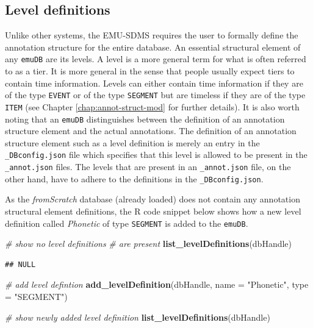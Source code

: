 \documentclass[]{book}
\newenvironment{Shaded}{\begin{snugshade}}{\end{snugshade}}
\newcommand{\CommentTok}[1]{\textcolor[rgb]{0.56,0.35,0.01}{\textit{#1}}}
\newcommand{\DataTypeTok}[1]{\textcolor[rgb]{0.13,0.29,0.53}{#1}}
\newcommand{\KeywordTok}[1]{\textcolor[rgb]{0.13,0.29,0.53}{\textbf{#1}}}
\newcommand{\NormalTok}[1]{#1}
\newcommand{\StringTok}[1]{\textcolor[rgb]{0.31,0.60,0.02}{#1}}
\theoremstyle{definition}
\theoremstyle{definition}
\theoremstyle{definition}
\theoremstyle{remark}
\begin{document}
\hypertarget{level-definitions}{%
\subsection{Level definitions}\label{level-definitions}}

Unlike other systems, the EMU-SDMS requires the user to formally define
the annotation structure for the entire database. An essential
structural element of any \texttt{emuDB} are its levels. A level is a
more general term for what is often referred to as a tier. It is more
general in the sense that people usually expect tiers to contain time
information. Levels can either contain time information if they are of
the type \texttt{EVENT} or of the type \texttt{SEGMENT} but are timeless
if they are of the type \texttt{ITEM} (see Chapter
\ref{chap:annot-struct-mod} for further details). It is also worth
noting that an \texttt{emuDB} distinguishes between the definition of an
annotation structure element and the actual annotations. The definition
of an annotation structure element such as a level definition is merely
an entry in the \texttt{\_DBconfig.json} file which specifies that this
level is allowed to be present in the \texttt{\_annot.json} files. The
levels that are present in an \texttt{\_annot.json} file, on the other
hand, have to adhere to the definitions in the \texttt{\_DBconfig.json}.

As the \emph{fromScratch} database (already loaded) does not contain any
annotation structural element definitions, the R code snippet below
shows how a new level definition called \emph{Phonetic} of type
\texttt{SEGMENT} is added to the \texttt{emuDB}.

\begin{Shaded}
\begin{Highlighting}[]
\CommentTok{# show no level definitions}
\CommentTok{# are present}
\KeywordTok{list_levelDefinitions}\NormalTok{(dbHandle)}
\end{Highlighting}
\end{Shaded}

\begin{verbatim}
## NULL
\end{verbatim}

\begin{Shaded}
\begin{Highlighting}[]
\CommentTok{# add level defintion}
\KeywordTok{add_levelDefinition}\NormalTok{(dbHandle,}
                    \DataTypeTok{name =} \StringTok{"Phonetic"}\NormalTok{,}
                    \DataTypeTok{type =} \StringTok{"SEGMENT"}\NormalTok{)}

\CommentTok{# show newly added level definition}
\KeywordTok{list_levelDefinitions}\NormalTok{(dbHandle)}
\end{Highlighting}
\end{Shaded}
\end{document}
